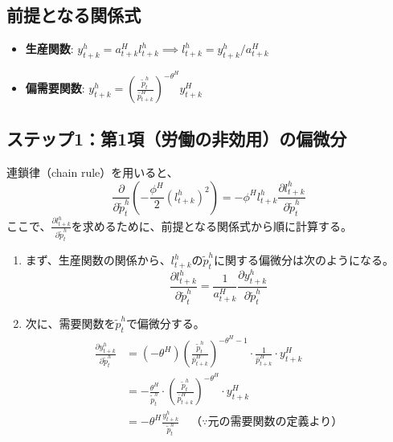 \subsection*{前提となる関係式}
\label{sec:appendix_optimal_price_derivation_foc_assumptions}
\begin{itemize}
    \item\label{itm:appendix_optimal_price_derivation_foc_production} \textbf{生産関数}: \(y_{t+k}^h=a_{t+k}^Hl_{t+k}^h\implies l_{t+k}^h=y_{t+k}^h/a_{t+k}^H\)
    \item\label{itm:appendix_optimal_price_derivation_foc_demand} \textbf{偏需要関数}: \(y_{t+k}^h=\left(\frac{\widetilde{p}_t^h}{\bar{p}_{t+k}^H}\right)^{-\theta^H}y_{t+k}^H\)
\end{itemize}

\subsection*{ステップ1：第1項（労働の非効用）の偏微分}
\label{sec:appendix_optimal_price_derivation_foc_sub1}
連鎖律（chain rule）を用いると、
\begin{equation}
\frac{\partial}{\partial\widetilde{p}_t^h}\left(-\frac{\phi^H}{2}(l_{t+k}^h)^2\right)=-\phi^Hl_{t+k}^h\frac{\partial l_{t+k}^h}{\partial\widetilde{p}_t^h}
\label{eq:appendix_optimal_price_derivation_foc_sub1_chain}
\end{equation}
ここで、\(\frac{\partial l_{t+k}^h}{\partial\widetilde{p}_t^h}\)を求めるために、前提となる関係式から順に計算する。

\begin{enumerate}
    \item\label{itm:appendix_optimal_price_derivation_foc_sub1_step1}まず、生産関数の関係から、\(l_{t+k}^h\)の\(\widetilde{p}_t^h\)に関する偏微分は次のようになる。
    \begin{equation}
    \frac{\partial l_{t+k}^h}{\partial\widetilde{p}_t^h}=\frac{1}{a_{t+k}^H}\frac{\partial y_{t+k}^h}{\partial\widetilde{p}_t^h}
    \label{eq:appendix_optimal_price_derivation_foc_sub1_relation}
    \end{equation}

    \item\label{itm:appendix_optimal_price_derivation_foc_sub1_step2}次に、需要関数を\(\widetilde{p}_t^h\)で偏微分する。
    \begin{equation}
    \begin{aligned}
    \frac{\partial y_{t+k}^h}{\partial\widetilde{p}_t^h}&=(-\theta^H)\left(\frac{\widetilde{p}_t^h}{\bar{p}_{t+k}^H}\right)^{-\theta^H-1}\cdot\frac{1}{\bar{p}_{t+k}^H}\cdot y_{t+k}^H \\
    &=-\frac{\theta^H}{\widetilde{p}_t^h}\cdot\left(\frac{\widetilde{p}_t^h}{\bar{p}_{t+k}^H}\right)^{-\theta^H}\cdot y_{t+k}^H \\
    &=-\theta^H\frac{y_{t+k}^h}{\widetilde{p}_t^h}\quad（\because\text{元の需要関数の定義より}）
    \end{aligned}
    \label{eq:appendix_optimal_price_derivation_foc_sub1_demand_deriv}
    \end{equation}
\end{enumerate}

